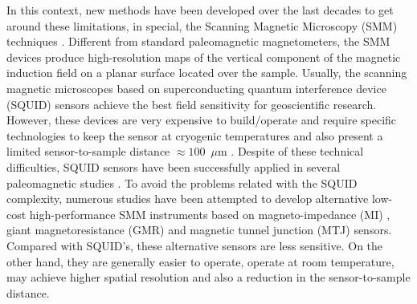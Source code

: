 \documentclass[galley,gc]{agutex}
\begin{document}
\begin{article}
In this context, new 
methods have been developed over the last decades to get around these limitations, in special, 
the Scanning Magnetic Microscopy (SMM) techniques \citep{kirschvink2008, oda2011, fu2014}. 
Different from 
standard paleomagnetic magnetometers, the SMM devices produce high-resolution maps of the 
vertical component of the magnetic induction field on a planar surface located over the 
sample. Usually, the scanning magnetic microscopes based on superconducting quantum 
interference device (SQUID) sensors achieve the best field sensitivity for geoscientific 
research. However, these devices are very expensive to build/operate and require specific 
technologies to keep the sensor at cryogenic temperatures and also present a limited 
sensor-to-sample distance $\approx 100$~$\mu$m \citep{baudenbacher2003, fong2005}. 
Despite of these technical difficulties, SQUID sensors have been successfully applied 
in several paleomagnetic studies 
\citep{gattacceca2006, weiss2007b, oda2011, fu2014, kirschvink2015}. 
To avoid the problems related with the SQUID complexity, numerous studies have been 
attempted to develop alternative low-cost high-performance SMM instruments based on 
magneto-impedance (MI) \citep{uehara2007, uehara2008}, giant magnetoresistance (GMR) 
\citep{hankard2009} and magnetic tunnel junction (MTJ) \citep{lima2014} sensors. 
Compared with SQUID's, these alternative sensors are less sensitive. On the other 
hand, they are generally easier to operate, operate at room temperature, 
may achieve higher spatial resolution and also a reduction in the sensor-to-sample 
distance.


\end{article}
\end{document}
